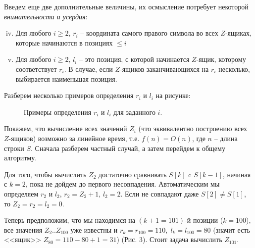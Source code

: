 \documentclass[letterpaper, 11pt]{article}
\begin{document}
\par
Введем еще две дополнительные величины, их осмысление потребует некоторой \textit{внимательности и усердия}:
\begin{enumerate}[(i)]
\setcounter{enumi}{3}
\item
Для любого $i \geq 2$, $r_i$ -- координата самого правого символа во всех $Z$-ящиках, которые начинаются в позициях $\leq i$
\item
Для любого $i \geq 2$, $l_i$ -- это позиция, с которой начинается $Z$-ящик, которому соответствует $r_i$. В случае, если $Z$-ящиков заканчивающихся на $r_i$ несколько, выбирается наименьшая позиция.
\end{enumerate}
\par
Разберем несколько примеров определения $r_i$ и $l_i$ на рисунке:
\begin{figure}[H]
  \caption{Примеры определения $r_i$ и $l_i$ для заданного $i$.}
\end{figure}
\par
Покажем, что вычисление всех значений $Z_i$ (что эквивалентно построению всех $Z$-ящиков) возможно за линейное время, т.е. $f(n) = O(n)$, где $n$ -- длина строки $S$. Сначала разберем частный случай, а затем перейдем к общему алгоритму.
\par
Для того, чтобы вычислить $Z_2$ достаточно сравнивать $S[k]$ c $S[k-1]$, начиная с $k = 2$, пока не дойдем до первого несовпадения. Автоматическим мы определяем $r_2$ и $l_2$, $r_2 = Z_2 + 1$, $l_2 = 2$. Если не совпадают даже $S[2] \neq S[1]$, то $Z_2 = r_2 = l_2 = 0$.
\par
Теперь предположим, что мы находимся на $(k+1 = 101)$-й позиции ($k = 100$), все значения $Z_2 .. Z_{100}$ уже известны и $r_k = r_{100} = 110, \; l_k = l_{100} = 80$ (значит есть <<ящик>> $Z_{80} = 110 - 80 + 1 = 31$) (Рис. 3). Стоит задача вычислить $Z_{101}$.
\end{document}
